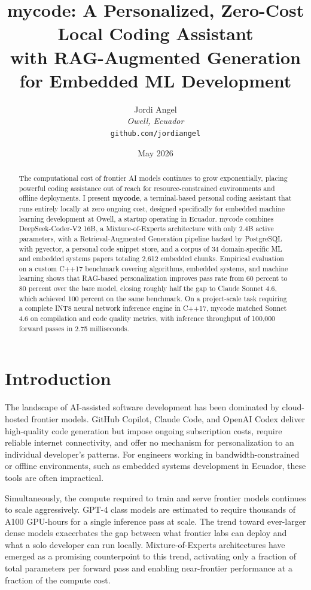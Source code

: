 \documentclass[11pt,twocolumn]{article}
\title{
    \textbf{mycode: A Personalized, Zero-Cost Local Coding Assistant} \\
    \large with RAG-Augmented Generation for Embedded ML Development
}
\author{
    Jordi Angel \\
    \textit{Owell, Ecuador} \\
    \texttt{github.com/jordiangel}
}
\date{May 2026}
\begin{document}
\maketitle

\begin{abstract}
The computational cost of frontier AI models continues to grow exponentially,
placing powerful coding assistance out of reach for resource-constrained
environments and offline deployments. I present \textbf{mycode}, a
terminal-based personal coding assistant that runs entirely locally at zero
ongoing cost, designed specifically for embedded machine learning development
at Owell, a startup operating in Ecuador. mycode combines DeepSeek-Coder-V2
16B, a Mixture-of-Experts architecture with only 2.4B active parameters, with
a Retrieval-Augmented Generation pipeline backed by PostgreSQL with pgvector,
a personal code snippet store, and a corpus of 34 domain-specific ML and
embedded systems papers totaling 2,612 embedded chunks. Empirical evaluation
on a custom C++17 benchmark covering algorithms, embedded systems, and machine
learning shows that RAG-based personalization improves pass rate from 60
percent to 80 percent over the bare model, closing roughly half the gap to
Claude Sonnet 4.6, which achieved 100 percent on the same benchmark. On a
project-scale task requiring a complete INT8 neural network inference engine
in C++17, mycode matched Sonnet 4.6 on compilation and code quality metrics,
with inference throughput of 100,000 forward passes in 2.75 milliseconds.
\end{abstract}

\section{Introduction}

The landscape of AI-assisted software development has been dominated by
cloud-hosted frontier models. GitHub Copilot, Claude Code, and OpenAI Codex
deliver high-quality code generation but impose ongoing subscription costs,
require reliable internet connectivity, and offer no mechanism for
personalization to an individual developer's patterns. For engineers working
in bandwidth-constrained or offline environments, such as embedded systems
development in Ecuador, these tools are often impractical.

Simultaneously, the compute required to train and serve frontier models
continues to scale aggressively. GPT-4 class models are estimated to require
thousands of A100 GPU-hours for a single inference pass at scale. The trend
toward ever-larger dense models exacerbates the gap between what frontier
labs can deploy and what a solo developer can run locally. Mixture-of-Experts
architectures have emerged as a promising counterpoint to this trend,
activating only a fraction of total parameters per forward pass and enabling
near-frontier performance at a fraction of the compute cost.
\end{document}
